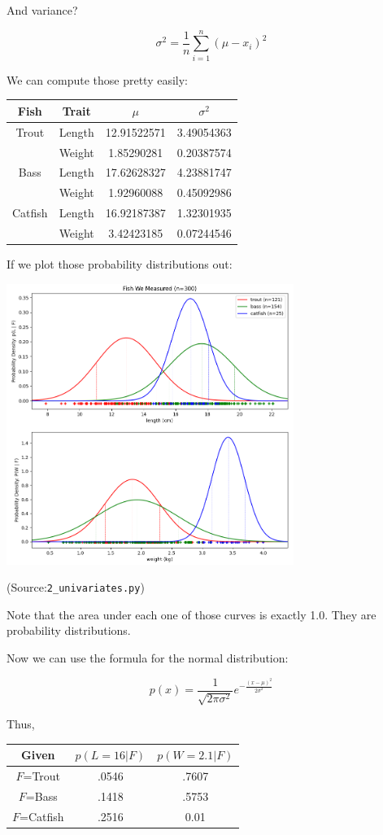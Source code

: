 And variance?

$$\sigma^2 = \frac{1}{n} \sum_{i=1}^{n} (\mu - x_i)^2$$

We can compute those pretty easily:

\begin{tabular}{c | c | c | c}
Fish & Trait & $\mu$ & $\sigma^2$ \\
\hline
Trout & Length & 12.91522571 & 3.49054363 \\
 & Weight &1.85290281 & 0.20387574\\
 \hline
Bass & Length & 17.62628327& 4.23881747 \\
 & Weight & 1.92960088&0.45092986 \\
\hline
Catfish & Length &16.92187387 & 1.32301935 \\
 & Weight & 3.42423185 & 0.07244546\\
\end{tabular}

If we plot those probability distributions out:

\includegraphics[width=0.7\textwidth]{2_unip.png}

(Source:\texttt{2\_univariates.py})

Note that the area under each one of those curves is exactly 1.0.  They are probability distributions.

Now we can use the formula for the normal distribution:

$$p(x) = \frac{1}{\sqrt{2\pi\sigma^2}} e^{-\frac{(x - \mu)^2}{2\sigma^2}}$$

Thus,

\begin{tabular}{c | c | c }
Given & $p(L=16 | F)$ & $p(W=2.1 | F)$ \\
\hline
$F$=Trout & .0546  & .7607 \\
$F$=Bass &  .1418 &.5753 \\
$F$=Catfish  & .2516 & 0.01 \\
\end{tabular}

